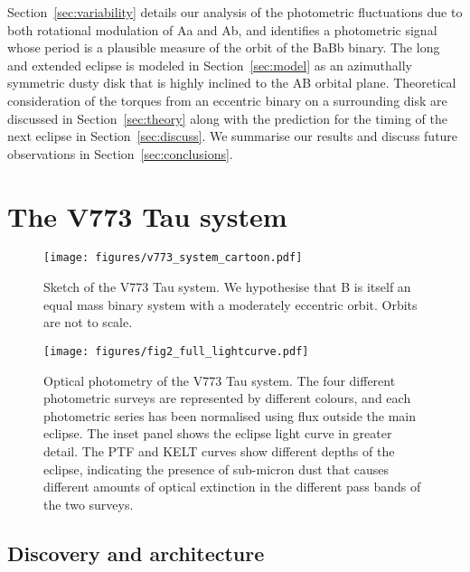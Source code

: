 \documentclass{aa}
\begin{document}
Section~\ref{sec:variability} details our analysis of the photometric fluctuations due to both rotational modulation of Aa and Ab, and identifies a photometric signal whose period is a plausible measure of the orbit of the BaBb binary.
%
The long and extended eclipse is modeled in Section~\ref{sec:model} as an azimuthally symmetric dusty disk that is highly inclined to the AB orbital plane.
%
Theoretical consideration of the torques from an eccentric binary on a surrounding disk are discussed in Section~\ref{sec:theory} along with the prediction for the timing of the next eclipse in Section~\ref{sec:discuss}.
%
We summarise our results and discuss future observations in Section~\ref{sec:conclusions}.

\section{The V773 Tau system}\label{sec:v773}

\begin{figure}
\begin{center}
    \centering
    \texttt{[image: figures/v773\_system\_cartoon.pdf]}
    \caption{Sketch of the V773 Tau system. 
    We hypothesise that B is itself an equal mass binary system with a moderately eccentric orbit.
    Orbits are not to scale.}
\label{fig:cartoon}
\end{center}
\end{figure}

\begin{figure*}
\begin{center}
    \centering
    \texttt{[image: figures/fig2\_full\_lightcurve.pdf]}
    \caption{Optical photometry of the V773 Tau system.
    The four different photometric surveys are represented by different colours, and each photometric series has been normalised using flux outside the main eclipse.
    The inset panel shows the eclipse light curve in greater detail.
    The PTF and KELT curves show different depths of the eclipse, indicating the presence of sub-micron dust that causes different amounts of optical extinction in the different pass bands of the two surveys.}
  \label{fig:lc}
\end{center}
\end{figure*}

\subsection{Discovery and architecture}
\end{document}
